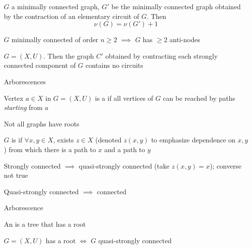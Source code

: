 \documentclass[aspectratio=43]{beamer}
\begin{document}
\begin{frame} 
\begin{theorem}
$G$ a minimally connected graph, $G'$ be the minimally connected graph obtained by the contraction of an elementary circuit of $G$.	Then
\[
\nu(G)=\nu(G')+1
\]
\end{theorem}
\vfill
\begin{theorem}
$G$ minimally connected of order $n\geq 2$ $\implies$ $G$ has $\geq 2$ anti-nodes
\end{theorem}
\vfill
\begin{theorem}
$G=(X,U)$. Then the graph $C'$ obtained by contracting each strongly connected component of $G$ contains no circuits
\end{theorem}
\end{frame}


\begin{frame}{Arborescences}
\begin{definition}[Root]
Vertex $a\in X$ in $G=(X,U)$ is a  if all vertices of $G$ can be reached by paths \emph{starting} from $a$
\end{definition}
Not all graphs have roots
\vfill
\begin{definition}
$G$ is  if $\forall x,y\in X$, exists $z\in X$ (denoted $z(x,y)$ to emphasize dependence on $x,y$) from which there is a path to $x$ and a path to $y$
\end{definition}
Strongly connected $\implies$ quasi-strongly connected (take $z(x,y)=x$); converse not true

Quasi-strongly connected $\implies$ connected
\end{frame}

\begin{frame}{Arborescence}
\begin{definition}[Arborescence]
An  is a tree that has a root
\end{definition}
\vfill
\begin{lemma}
$G=(X,U)$ has a root $\iff$ $G$ quasi-strongly connected
\end{lemma}
\end{frame}
\end{document}
